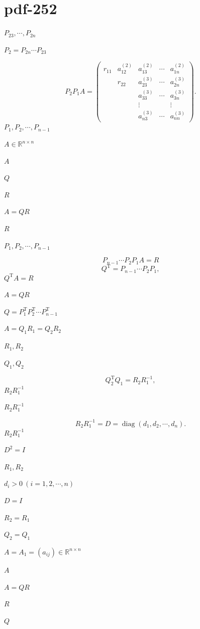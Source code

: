 \documentclass[UTF8,fontset=fandol]{ctexart}
\begin{document}
\section*{pdf-252}
$P_{23},\cdots,P_{2n}$\par
$P_2=P_{2n}\cdots P_{23}$\par
\[
P_2P_1A=\begin{pmatrix}
r_{11}&a_{12}^{(2)}&a_{13}^{(2)}&\cdots&a_{1n}^{(2)}\\
&r_{22}&a_{23}^{(3)}&\cdots&a_{2n}^{(3)}\\
&&a_{33}^{(3)}&\cdots&a_{3n}^{(3)}\\
&&\vdots&&\vdots\\
&&a_{n3}^{(3)}&\cdots&a_{nn}^{(3)}
\end{pmatrix}.
\]
$P_1,P_2,\cdots,P_{n-1}$\par
$A\in\mathbb R^{n\times n}$\par
$A$\par
$Q$\par
$R$\par
$A=QR$\par
$R$\par
$P_1,P_2,\cdots,P_{n-1}$\par
\[
P_{n-1}\cdots P_2P_1A=R
\tag{9.4.6}
\]
\[
Q^{\mathrm T}=P_{n-1}\cdots P_2P_1,
\]
$Q^{\mathrm T}A=R$\par
$A=QR$\par
$Q=P_1^{\mathrm T}P_2^{\mathrm T}\cdots P_{n-1}^{\mathrm T}$\par
$A=Q_1R_1=Q_2R_2$\par
$R_1,R_2$\par
$Q_1,Q_2$\par
\[
Q_2^{\mathrm T}Q_1=R_2R_1^{-1},
\tag{9.4.7}
\]
$R_2R_1^{-1}$\par
$R_2R_1^{-1}$\par
\[
R_2R_1^{-1}=D=\operatorname{diag}(d_1,d_2,\cdots,d_n).
\]
$R_2R_1^{-1}$\par
$D^2=I$\par
$R_1,R_2$\par
$d_i>0\ (i=1,2,\cdots,n)$\par
$D=I$\par
$R_2=R_1$\par
$Q_2=Q_1$\par
$A=A_1=(a_{ij})\in\mathbb R^{n\times n}$\par
$A$\par
$A=QR$\par
$R$\par
$Q$\par
\end{document}

